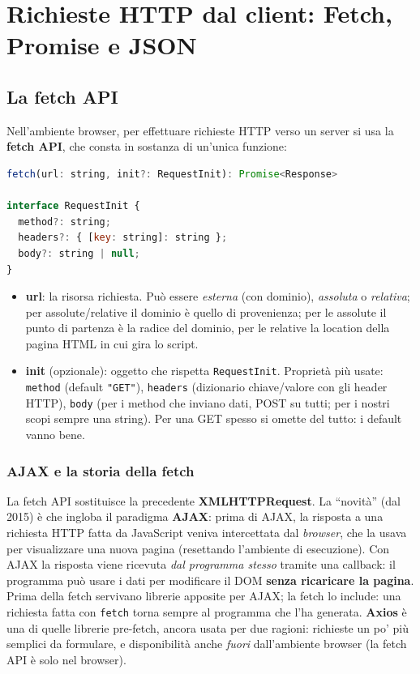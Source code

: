 \chapter{Richieste HTTP dal client: Fetch, Promise e JSON}

\section{La fetch API}

\begin{definizione}[fetch]
Nell'ambiente browser, per effettuare richieste HTTP verso un server si usa la
\textbf{fetch API}, che consta in sostanza di un'unica funzione:
\begin{lstlisting}[language=JavaScript]
fetch(url: string, init?: RequestInit): Promise<Response>

interface RequestInit {
  method?: string;
  headers?: { [key: string]: string };
  body?: string | null;
}
\end{lstlisting}
\end{definizione}

\begin{itemize}
  \item \textbf{url}: la risorsa richiesta. Pu\`o essere \emph{esterna} (con dominio),
        \emph{assoluta} o \emph{relativa}; per assolute/relative il dominio \`e quello di
        provenienza; per le assolute il punto di partenza \`e la radice del dominio, per le
        relative la location della pagina HTML in cui gira lo script.
  \item \textbf{init} (opzionale): oggetto che rispetta \texttt{RequestInit}. Propriet\`a
        pi\`u usate: \texttt{method} (default \texttt{"GET"}), \texttt{headers} (dizionario
        chiave/valore con gli header HTTP), \texttt{body} (per i method che inviano dati,
        POST su tutti; per i nostri scopi sempre una string). Per una GET spesso si omette
        del tutto: i default vanno bene.
\end{itemize}

\subsection{AJAX e la storia della fetch}
La fetch API sostituisce la precedente \textbf{XMLHTTPRequest}. La ``novit\`a'' (dal 2015)
\`e che ingloba il paradigma \textbf{AJAX}: prima di AJAX, la risposta a una richiesta HTTP
fatta da JavaScript veniva intercettata dal \emph{browser}, che la usava per visualizzare una
nuova pagina (resettando l'ambiente di esecuzione). Con AJAX la risposta viene ricevuta
\emph{dal programma stesso} tramite una callback: il programma pu\`o usare i dati per
modificare il DOM \textbf{senza ricaricare la pagina}. Prima della fetch servivano librerie
apposite per AJAX; la fetch lo include: una richiesta fatta con \texttt{fetch} torna sempre
al programma che l'ha generata.
\textbf{Axios} \`e una di quelle librerie pre-fetch, ancora usata per due ragioni: richieste
un po' pi\`u semplici da formulare, e disponibilit\`a anche \emph{fuori} dall'ambiente
browser (la fetch API \`e solo nel browser).

